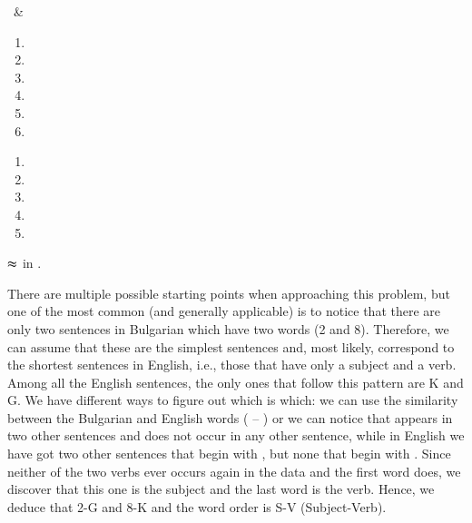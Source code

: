 \begin{refsection}
\begin{problem}{\langnameBulgarian}{\nameKLow\ \& \nameMVasev}{}
\begin{assgts}
\item \detcorr
\item \transinen
\begin{enumerate}[start = 13]
    \item {}
    \item {}
    \item {}
    \item {}
    \item {}
    \item {}
\end{enumerate}
\item \transinen[\langnameBulgarian]
\begin{enumerate}[start = 19]
    \item {}
    \item {}
    \item {}
    \item {}
    \item {}
\end{enumerate}
\end{assgts}

\begin{tblsWarning}
 $\thickapprox$  in .
\end{tblsWarning}
\end{problem}
\begin{mysolution}

 There are multiple possible starting points when approaching this problem, but one of the most common (and generally applicable) is to notice that there are only two sentences in Bulgarian which have two words (2 and 8). Therefore, we can assume that these are the simplest sentences and, most likely, correspond to the shortest sentences in English, i.e., those that have only a subject and a verb. Among all the English sentences, the only ones that follow this pattern are K and G. We have different ways to figure out which is which: we can use the similarity between the Bulgarian and English words ( – ) or we can notice that  appears in two other sentences and  does not occur in any other sentence, while in English we have got two other sentences that begin with , but none that begin with . Since neither of the two verbs ever occurs again in the data and the first word does, we discover that this one is the subject and the last word is the verb. Hence, we deduce that 2-G and 8-K and the word order is S-V (Subject-Verb).


\end{mysolution}
\end{refsection}
